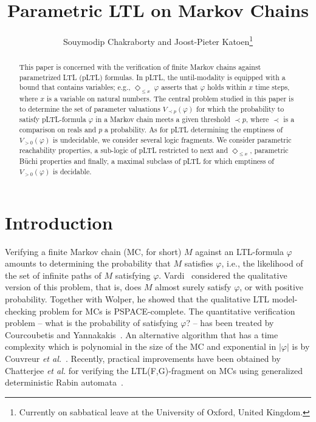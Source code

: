 \documentclass{llncs}
\title{Parametric LTL on Markov Chains}
\author{Souymodip Chakraborty and Joost-Pieter Katoen\thanks{Currently on sabbatical leave at the University of Oxford, United Kingdom.}}
\institute{RWTH Aachen University, Ahornstra\ss{}e 55, D-52074 Aachen, Germany}
\renewcommand{\leq}{\leqslant}
\newcommand{\de}{\Diamond}
\begin{document}
 \maketitle

\begin{abstract}
This paper is concerned with the verification of finite Markov chains against parametrized LTL (pLTL) formulas.
In pLTL, the until-modality is equipped with a bound that contains variables; e.g., $\de_{\leq x}\ \varphi$ asserts that $\varphi$ holds within $x$ 
time steps, where $x$ is a variable on natural numbers.
The central problem studied in this paper is to determine the set of parameter valuations $V_{\prec p} (\varphi)$ for which the probability to satisfy pLTL-formula 
$\varphi$ in a Markov chain meets 
a given threshold $\prec p$, where $\prec$ is a comparison on reals and $p$ a probability.
As for pLTL determining the emptiness of $V_{> 0}(\varphi)$ is undecidable, we consider several logic fragments.
We consider parametric reachability properties, 
a sub-logic of pLTL restricted to next and $\de_{\leq x}$, 
parametric B\"uchi properties and finally, a maximal subclass of pLTL for which emptiness of $V_{> 0}(\varphi)$ is decidable.
\end{abstract}

\section{Introduction} 
Verifying a finite Markov chain (MC, for short) $M$ against an LTL-formula $\varphi$ amounts to determining the probability that $M$ satisfies $\varphi$, i.e., 
the likelihood of the set of  infinite paths of $M$ satisfying $\varphi$.
Vardi~\cite{DBLP:conf/focs/Vardi85} considered the qualitative version of this problem, that is, does $M$ almost surely satisfy $\varphi$, or with positive probability.
Together with Wolper, he showed that the qualitative LTL model-checking problem for MCs is PSPACE-complete.
The quantitative verification problem -- what is the probability of satisfying $\varphi$? -- has been treated by Courcoubetis and 
Yannakakis~\cite{DBLP:journals/jacm/CourcoubetisY95}.
An alternative algorithm that has a time complexity which is polynomial in the size of the MC and exponential in $| \varphi |$ is by 
Couvreur \emph{et al.}~\cite{CouvreurSahebSutre03}.
Recently, practical improvements have been obtained by Chatterjee \emph{et al.} for verifying the LTL(F,G)-fragment on MCs using generalized deterministic Rabin automata~\cite{DBLP:conf/cav/ChatterjeeGK13}.
\end{document}
